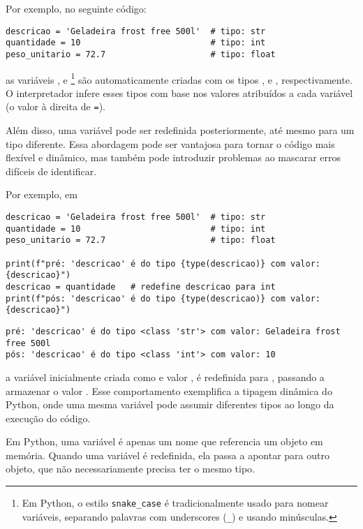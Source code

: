 Por exemplo, no seguinte código:
\begin{verbatim}
descricao = 'Geladeira frost free 500l'  # tipo: str
quantidade = 10                          # tipo: int
peso_unitario = 72.7                     # tipo: float
\end{verbatim}

as variáveis ,  e
\footnote{Em Python, o estilo \texttt{snake\_case} é tradicionalmente usado para nomear variáveis,
separando palavras com underscores (\texttt{\_}) e usando minúsculas.}
são automaticamente criadas com os tipos
,  e , respectivamente.
O interpretador infere esses tipos com base nos valores atribuídos a cada variável
(o valor à direita de \texttt{=}).

Além disso, uma variável pode ser redefinida posteriormente, até mesmo para um tipo diferente.
Essa abordagem pode ser vantajosa para tornar o código mais flexível e dinâmico, mas também pode introduzir problemas ao
mascarar erros difíceis de identificar.

Por exemplo, em
\begin{verbatim}
descricao = 'Geladeira frost free 500l'  # tipo: str
quantidade = 10                          # tipo: int
peso_unitario = 72.7                     # tipo: float

print(f"pré: 'descricao' é do tipo {type(descricao)} com valor: {descricao}")
descricao = quantidade   # redefine descricao para int
print(f"pós: 'descricao' é do tipo {type(descricao)} com valor: {descricao}")
\end{verbatim}
\begin{verbatim}
pré: 'descricao' é do tipo <class 'str'> com valor: Geladeira frost free 500l
pós: 'descricao' é do tipo <class 'int'> com valor: 10
\end{verbatim}

a variável  inicialmente criada como  e valor , é redefinida para
, passando a armazenar o valor .
Esse comportamento exemplifica a tipagem dinâmica do Python, onde uma mesma variável pode assumir diferentes tipos ao
longo da execução do código.

Em Python, uma variável é apenas um nome que referencia um objeto em memória.
Quando uma variável é redefinida, ela passa a apontar para outro objeto, que não necessariamente precisa ter o mesmo tipo.

